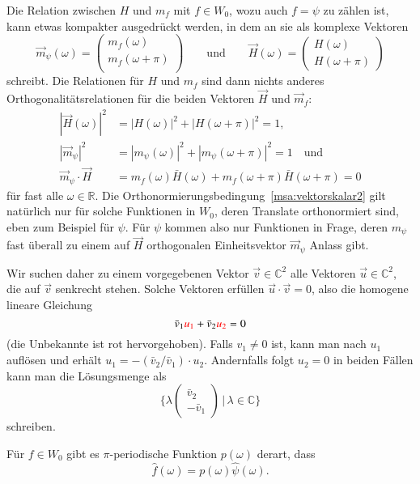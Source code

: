 Die Relation zwischen $H$ und $m_f$ mit $f\in W_0$, wozu auch $f=\psi$
zu zählen ist, kann etwas kompakter ausgedrückt werden, in dem an sie
als komplexe Vektoren
\[
\vec{m}_{\psi}(\omega)
=
\begin{pmatrix}
m_{f}(\omega)\\
m_{f}(\omega+\pi)\\
\end{pmatrix}
\qquad\text{und}\qquad
\vec{H}(\omega)
=
\begin{pmatrix}
H(\omega)\\
H(\omega + \pi)
\end{pmatrix}
\]
schreibt.
Die Relationen für $H$ und $m_f$ sind dann nichts anderes 
Orthogonalitätsrelationen für die beiden Vektoren $\vec{H}$ und
$\vec{m}_f$:
\begin{align}
|\vec{H}(\omega)|^2
&=
|H(\omega)|^2 + |H(\omega+\pi)|^2 = 1,
\label{msa:vektorskalar1}
\\
|\vec{m}_{\psi}|^2
&=
|m_{\psi}(\omega)|^2 + |m_{\psi}(\omega+\pi)|^2 = 1\quad\text{und}
\label{msa:vektorskalar2}
\\
\vec{m}_{\psi}\cdot\vec{H}
&=
m_{f}(\omega)\bar{H}(\omega)
+
m_{f}(\omega+\pi)\bar{H}(\omega+\pi)
=
0
\label{msa:vektorskalar3}
\end{align}
für fast alle $\omega\in\mathbb R$.
Die Orthonormierungsbedingung~\eqref{msa:vektorskalar2} gilt natürlich
nur für solche Funktionen in $W_0$, deren Translate orthonormiert sind,
eben zum Beispiel für $\psi$.
Für $\psi$ kommen also nur Funktionen in Frage, deren $m_{\psi}$ 
fast überall zu einem auf $\vec{H}$ orthogonalen Einheitsvektor
$\vec{m}_\psi$ Anlass gibt.

Wir suchen daher zu einem vorgegebenen Vektor $\vec{v}\in\mathbb C^2$
alle Vektoren $\vec{u}\in\mathbb C^2$, die auf $\vec{v}$ senkrecht stehen.
Solche Vektoren erfüllen $\vec{u}\cdot\vec{v}=0$, also die homogene
lineare Gleichung
\[
\bar{v}_1 {\color{red}u_1} + \bar{v}_2 {\color{red} u_2} =0 
\]
(die Unbekannte ist {\color{red}rot} hervorgehoben).
Falls $v_1\ne 0$ ist, kann man nach $u_1$ auflösen und erhält
$u_1= -(\bar{v}_2/\bar{v}_1)\cdot u_2$.
Andernfalls folgt $u_2=0$ in beiden Fällen kann man die Lösungsmenge
als
\[
\biggl\{
\lambda
\begin{pmatrix}\bar{v}_2\\-\bar{v}_1\end{pmatrix}
\,\bigg|
\,\lambda\in\mathbb C
\biggr\}
\]
schreiben.

\begin{lemma}
\label{lemma:msa:pperiodisch}
Für $f\in W_0$ gibt es $\pi$-periodische Funktion $p(\omega)$ derart,
dass 
\begin{equation*}
\hat{f}(\omega)
=
p(\omega) \hat{\psi}(\omega).
\end{equation*}
\end{lemma}

